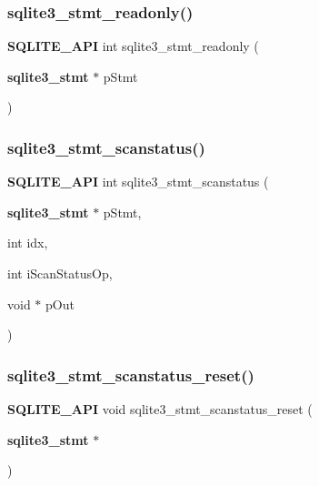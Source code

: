 \subsubsection{sqlite3\_stmt\_readonly()}
{\footnotesize\ttfamily \textbf{ S\+Q\+L\+I\+T\+E\+\_\+\+A\+PI} int sqlite3\+\_\+stmt\+\_\+readonly (\begin{DoxyParamCaption}\item[{\textbf{ sqlite3\+\_\+stmt} $\ast$}]{p\+Stmt }\end{DoxyParamCaption})}

\mbox{\label{sqlite3_8h_ae7364a8d3e5247bfe3ff04a535ed20fe}} 
\subsubsection{sqlite3\_stmt\_scanstatus()}
{\footnotesize\ttfamily \textbf{ S\+Q\+L\+I\+T\+E\+\_\+\+A\+PI} int sqlite3\+\_\+stmt\+\_\+scanstatus (\begin{DoxyParamCaption}\item[{\textbf{ sqlite3\+\_\+stmt} $\ast$}]{p\+Stmt,  }\item[{int}]{idx,  }\item[{int}]{i\+Scan\+Status\+Op,  }\item[{void $\ast$}]{p\+Out }\end{DoxyParamCaption})}

\mbox{\label{sqlite3_8h_a338b87a26b5670343778cab0768325c0}} 
\subsubsection{sqlite3\_stmt\_scanstatus\_reset()}
{\footnotesize\ttfamily \textbf{ S\+Q\+L\+I\+T\+E\+\_\+\+A\+PI} void sqlite3\+\_\+stmt\+\_\+scanstatus\+\_\+reset (\begin{DoxyParamCaption}\item[{\textbf{ sqlite3\+\_\+stmt} $\ast$}]{ }\end{DoxyParamCaption})}

\mbox{\label{sqlite3_8h_a86d220828ff29420097add1507fc8832}} 
